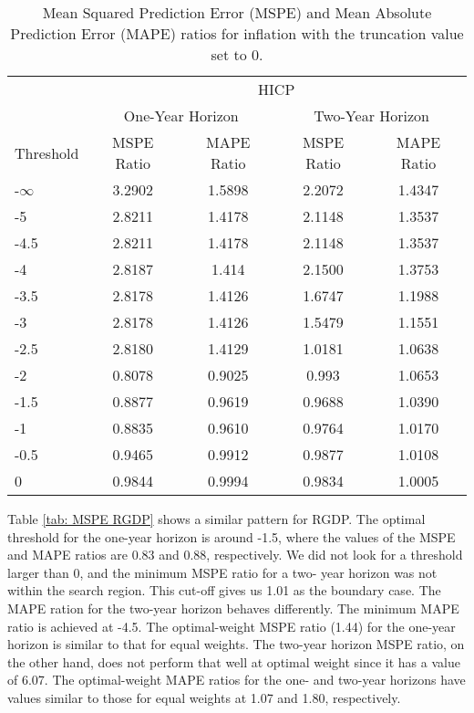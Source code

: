\documentclass[11pt]{article}
\begin{document}
	
	\begin{table}[!h]
		\centering
		\caption{Mean Squared Prediction Error (MSPE) and Mean Absolute Prediction Error (MAPE) ratios for inflation with the truncation value set to 0.}
		\label{tab: MSPE HICP}
		\begin{tabular}{lcccc}
			\hline\hline
			&                        \multicolumn{4}{c}{HICP}                         \\
			\cmidrule(lr){2-5}                              & \multicolumn{2}{c}{One-Year Horizon} & \multicolumn{2}{c}{Two-Year Horizon} \\
			\cmidrule(lr){2-3} \cmidrule(lr){4-5}
			Threshold & MSPE Ratio &    MAPE Ratio    & MSPE Ratio &    MAPE Ratio    \\ \hline
			-$\infty$ & 3.2902 & 1.5898 & 2.2072 & 1.4347\\ 
			-5 & 2.8211 & 1.4178 & 2.1148 & 1.3537\\ 
			-4.5 & 2.8211 & 1.4178 & 2.1148 & 1.3537\\ 
			-4 & 2.8187 & 1.414 & 2.1500 & 1.3753\\ 
			-3.5 & 2.8178 & 1.4126 & 1.6747 & 1.1988\\ 
			-3 & 2.8178 & 1.4126 & 1.5479 & 1.1551\\ 
			-2.5 & 2.8180 & 1.4129 & 1.0181 & 1.0638\\ 
			-2 & 0.8078 & 0.9025 & 0.993 & 1.0653\\ 
			-1.5 & 0.8877 & 0.9619 & 0.9688 & 1.0390\\ 
			-1 & 0.8835 & 0.9610 & 0.9764 & 1.0170\\ 
			-0.5 & 0.9465 & 0.9912 & 0.9877 & 1.0108\\ 
			0 & 0.9844 & 0.9994 & 0.9834 & 1.0005\\ 		 \hline\hline
		\end{tabular}
	\end{table}
	
	Table \ref{tab: MSPE RGDP} shows a similar pattern for RGDP. The optimal threshold for the one-year horizon is around -1.5, where the values of the MSPE and MAPE ratios are 0.83 and 0.88, respectively. We did not look for a threshold larger than 0, and the minimum MSPE ratio for a two- year horizon was not within the search region. This cut-off gives us 1.01 as the boundary case. The MAPE ration for the two-year horizon behaves differently. The minimum MAPE ratio is achieved at -4.5. The optimal-weight MSPE ratio (1.44) for the one-year horizon is similar to that for equal weights. The two-year horizon MSPE ratio, on the other hand, does not perform that well at optimal weight since it has a value of 6.07. The optimal-weight MAPE ratios for the one- and two-year horizons have values similar to those for equal weights at 1.07 and 1.80, respectively.
	
\end{document}
